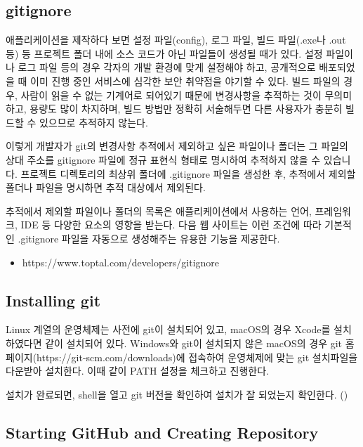 \subsection*{gitignore}

애플리케이션을 제작하다 보면 설정 파일(config), 로그 파일, 빌드 파일(.exe나 .out 등) 등 프로젝트 폴더 내에 소스 코드가 아닌 파일들이 생성될 때가 있다. 설정 파일이나 로그 파일 등의 경우 각자의 개발 환경에 맞게 설정해야 하고, 공개적으로 배포되었을 때 이미 진행 중인 서비스에 심각한 보안 취약점을 야기할 수 있다. 빌드 파일의 경우, 사람이 읽을 수 없는 기계어로 되어있기 때문에 변경사항을 추적하는 것이 무의미하고, 용량도 많이 차지하며, 빌드 방법만 정확히 서술해두면 다른 사용자가 충분히 빌드할 수 있으므로 추적하지 않는다.

이렇게 개발자가 git의 변경사항 추적에서 제외하고 싶은 파일이나 폴더는 그 파일의 상대 주소를 gitignore 파일에 정규 표현식 형태로 명시하여 추적하지 않을 수 있습니다. 프로젝트 디렉토리의 최상위 폴더에 .gitignore 파일을 생성한 후, 추적에서 제외할 폴더나 파일을 명시하면 추적 대상에서 제외된다.

추적에서 제외할 파일이나 폴더의 목록은 애플리케이션에서 사용하는 언어, 프레임워크, IDE 등 다양한 요소의 영향을 받는다. 다음 웹 사이트는 이런 조건에 따라 기본적인 .gitignore 파일을 자동으로 생성해주는 유용한 기능을 제공한다.

\begin{itemize}
    \item https://www.toptal.com/developers/gitignore
\end{itemize}

\subsection*{Installing git}

Linux 계열의 운영체제는 사전에 git이 설치되어 있고, macOS의 경우 Xcode를 설치하였다면 같이 설치되어 있다. Windows와 git이 설치되지 않은 macOS의 경우 git 홈페이지(https://git-scm.com/downloads)에 접속하여 운영체제에 맞는 git 설치파일을 다운받아 설치한다. 이때 \와 같이 PATH 설정을 체크하고 진행한다.

설치가 완료되면, shell을 열고 git 버전을 확인하여 설치가 잘 되었는지 확인한다. ()


\subsection*{Starting GitHub and Creating Repository}

